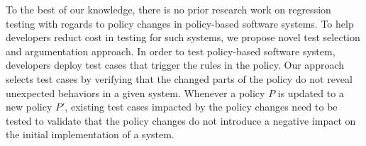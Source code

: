 To the best of our knowledge, there is no prior research
work on regression testing with regards to policy changes in policy-based software systems.
To help developers reduct cost in testing for such systems,
we propose novel test selection and argumentation approach. 
In order to test policy-based software system,
developers deploy test cases that trigger the rules in the policy.
Our approach selects test cases by verifying that the changed parts of 
the policy do not reveal unexpected behaviors in a given system.
Whenever a policy $P$ is updated to a new policy $P'$,
existing test cases impacted by the policy changes need to be tested to validate that the policy changes do not introduce a negative impact on the initial implementation of a system.





